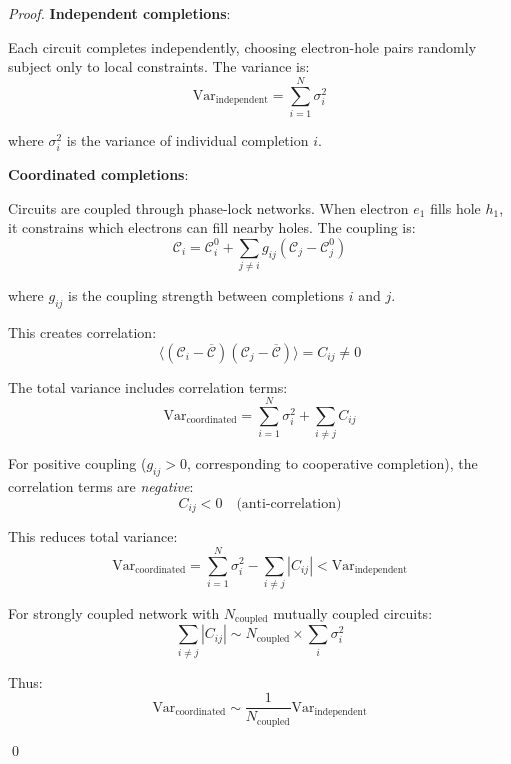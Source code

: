\documentclass[12pt,a4paper]{article}
\begin{document}
\begin{proof}
\textbf{Independent completions}:

Each circuit completes independently, choosing electron-hole pairs randomly subject only to local constraints. The variance is:
\begin{equation}
\text{Var}_{\text{independent}} = \sum_{i=1}^{N} \sigma_i^2
\end{equation}

where $\sigma_i^2$ is the variance of individual completion $i$.

\textbf{Coordinated completions}:

Circuits are coupled through phase-lock networks. When electron $e_1$ fills hole $h_1$, it constrains which electrons can fill nearby holes. The coupling is:
\begin{equation}
\mathcal{C}_i = \mathcal{C}_i^0 + \sum_{j \neq i} g_{ij} (\mathcal{C}_j - \mathcal{C}_j^0)
\end{equation}

where $g_{ij}$ is the coupling strength between completions $i$ and $j$.

This creates correlation:
\begin{equation}
\langle (\mathcal{C}_i - \overline{\mathcal{C}}) (\mathcal{C}_j - \overline{\mathcal{C}}) \rangle = C_{ij} \neq 0
\end{equation}

The total variance includes correlation terms:
\begin{equation}
\text{Var}_{\text{coordinated}} = \sum_{i=1}^{N} \sigma_i^2 + \sum_{i \neq j} C_{ij}
\end{equation}

For positive coupling ($g_{ij} > 0$, corresponding to cooperative completion), the correlation terms are \textit{negative}:
\begin{equation}
C_{ij} < 0 \quad \text{(anti-correlation)}
\end{equation}

This reduces total variance:
\begin{equation}
\text{Var}_{\text{coordinated}} = \sum_{i=1}^{N} \sigma_i^2 - \sum_{i \neq j} |C_{ij}| < \text{Var}_{\text{independent}}
\end{equation}

For strongly coupled network with $N_{\text{coupled}}$ mutually coupled circuits:
\begin{equation}
\sum_{i \neq j} |C_{ij}| \sim N_{\text{coupled}} \times \sum_i \sigma_i^2
\end{equation}

Thus:
\begin{equation}
\text{Var}_{\text{coordinated}} \sim \frac{1}{N_{\text{coupled}}} \text{Var}_{\text{independent}}
\end{equation}

\qed
\end{proof}
\end{document}
